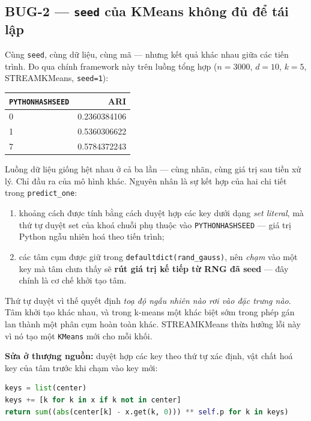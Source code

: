 \documentclass[11pt,a4paper]{article}
\theoremstyle{remark}
\begin{document}
\subsection{BUG-2 --- \texorpdfstring{\texttt{seed}}{seed} của KMeans không đủ để tái lập}
\label{sec:bug2}

Cùng \texttt{seed}, cùng dữ liệu, cùng mã --- nhưng kết quả khác nhau giữa các
tiến trình. Đo qua chính framework này trên luồng tổng hợp
($n=3000$, $d=10$, $k=5$, STREAMKMeans, \texttt{seed=1}):

\begin{center}
\small
\begin{tabular}{@{}lr@{}}
\toprule
\texttt{PYTHONHASHSEED} & \textbf{ARI} \\
\midrule
0 & 0.2360384106 \\
1 & 0.5360306622 \\
7 & 0.5784372243 \\
\bottomrule
\end{tabular}
\end{center}

Luồng dữ liệu giống hệt nhau ở cả ba lần --- cùng nhãn, cùng giá trị sau tiền xử
lý. Chỉ đầu ra của mô hình khác. Nguyên nhân là sự kết hợp của hai chi tiết
trong \texttt{predict\_one}:

\begin{enumerate}
  \item khoảng cách được tính bằng cách duyệt hợp các key dưới dạng
        \emph{set literal}, mà thứ tự duyệt set của khoá chuỗi phụ thuộc vào
        \texttt{PYTHONHASHSEED} --- giá trị Python ngẫu nhiên hoá theo tiến trình;
  \item các tâm cụm được giữ trong \texttt{defaultdict(rand\_gauss)}, nên
        \emph{chạm} vào một key mà tâm chưa thấy sẽ \textbf{rút giá trị kế tiếp
        từ RNG đã seed} --- đây chính là cơ chế khởi tạo tâm.
\end{enumerate}

Thứ tự duyệt vì thế quyết định \emph{toạ độ ngẫu nhiên nào rơi vào đặc trưng
nào}. Tâm khởi tạo khác nhau, và trong k-means một khác biệt sớm trong phép gán
lan thành một phân cụm hoàn toàn khác. STREAMKMeans thừa hưởng lỗi này vì nó tạo
một \texttt{KMeans} mới cho mỗi khối.

\textbf{Sửa ở thượng nguồn:} duyệt hợp các key theo thứ tự xác định, vật chất hoá
key của tâm trước khi chạm vào key mới:
\begin{lstlisting}[language=Python]
keys = list(center)
keys += [k for k in x if k not in center]
return sum((abs(center[k] - x.get(k, 0))) ** self.p for k in keys)
\end{lstlisting}
\end{document}
